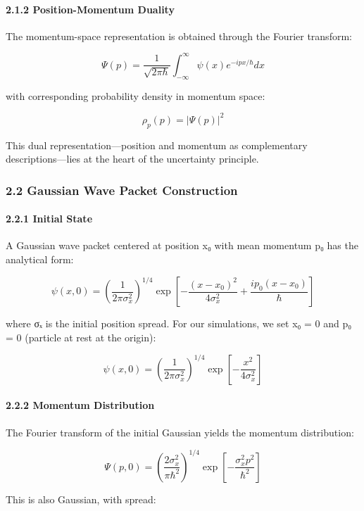 \documentclass[
  11pt,
]{article}
\begin{document}
\paragraph{2.1.2 Position-Momentum
Duality}\label{position-momentum-duality}

The momentum-space representation is obtained through the Fourier
transform:

\[\Psi(p) = \frac{1}{\sqrt{2\pi\hbar}}\int_{-\infty}^{\infty} \psi(x)e^{-ipx/\hbar}dx\]

with corresponding probability density in momentum space:

\[\rho_p(p) = |\Psi(p)|^2\]

This dual representation---position and momentum as complementary
descriptions---lies at the heart of the uncertainty principle.

\subsubsection{2.2 Gaussian Wave Packet
Construction}\label{gaussian-wave-packet-construction}

\paragraph{2.2.1 Initial State}\label{initial-state}

A Gaussian wave packet centered at position x₀ with mean momentum p₀ has
the analytical form:

\[\psi(x,0) = \left(\frac{1}{2\pi\sigma_x^2}\right)^{1/4} \exp\left[-\frac{(x-x_0)^2}{4\sigma_x^2} + \frac{ip_0(x-x_0)}{\hbar}\right]\]

where σₓ is the initial position spread. For our simulations, we set x₀
= 0 and p₀ = 0 (particle at rest at the origin):

\[\psi(x,0) = \left(\frac{1}{2\pi\sigma_x^2}\right)^{1/4} \exp\left[-\frac{x^2}{4\sigma_x^2}\right]\]

\paragraph{2.2.2 Momentum Distribution}\label{momentum-distribution}

The Fourier transform of the initial Gaussian yields the momentum
distribution:

\[\Psi(p,0) = \left(\frac{2\sigma_x^2}{\pi\hbar^2}\right)^{1/4} \exp\left[-\frac{\sigma_x^2 p^2}{\hbar^2}\right]\]

This is also Gaussian, with spread:
\end{document}
